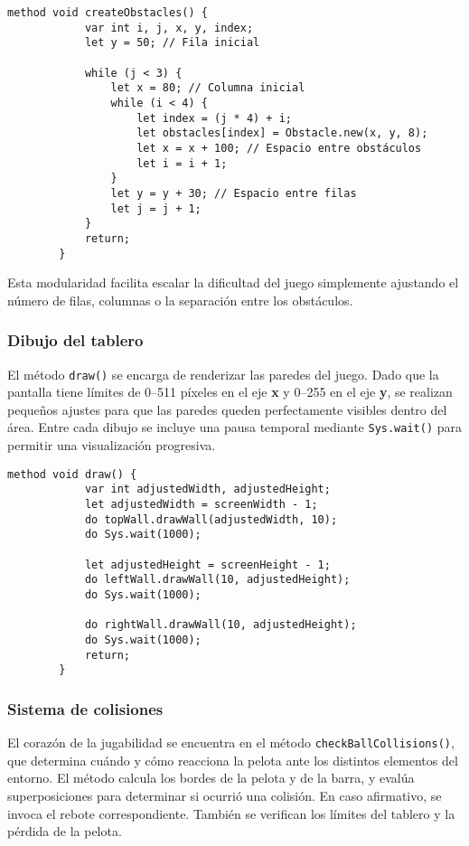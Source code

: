\documentclass[twocolumn]{article}
\begin{document}
	\begin{lstlisting}[caption=Método de creación de obstáculos]
		method void createObstacles() {
			var int i, j, x, y, index;
			let y = 50; // Fila inicial
			
			while (j < 3) {
				let x = 80; // Columna inicial
				while (i < 4) {
					let index = (j * 4) + i;
					let obstacles[index] = Obstacle.new(x, y, 8);
					let x = x + 100; // Espacio entre obstáculos
					let i = i + 1;
				}
				let y = y + 30; // Espacio entre filas
				let j = j + 1;
			}
			return;
		}
	\end{lstlisting}
	
	Esta modularidad facilita escalar la dificultad del juego simplemente ajustando el número de filas, columnas o la separación entre los obstáculos.
	
	\subsubsection{Dibujo del tablero}
	El método \texttt{draw()} se encarga de renderizar las paredes del juego. Dado que la pantalla tiene límites de 0–511 píxeles en el eje \textbf{x} y 0–255 en el eje \textbf{y}, se realizan pequeños ajustes para que las paredes queden perfectamente visibles dentro del área. Entre cada dibujo se incluye una pausa temporal mediante \texttt{Sys.wait()} para permitir una visualización progresiva.
	
	\begin{lstlisting}[caption=Método de dibujo del tablero]
		method void draw() {
			var int adjustedWidth, adjustedHeight;
			let adjustedWidth = screenWidth - 1;
			do topWall.drawWall(adjustedWidth, 10);
			do Sys.wait(1000);
			
			let adjustedHeight = screenHeight - 1;
			do leftWall.drawWall(10, adjustedHeight);
			do Sys.wait(1000);
			
			do rightWall.drawWall(10, adjustedHeight);
			do Sys.wait(1000);
			return;
		}
	\end{lstlisting}
	
	\subsubsection{Sistema de colisiones}
	El corazón de la jugabilidad se encuentra en el método \texttt{checkBallCollisions()}, que determina cuándo y cómo reacciona la pelota ante los distintos elementos del entorno.  
	El método calcula los bordes de la pelota y de la barra, y evalúa superposiciones para determinar si ocurrió una colisión. En caso afirmativo, se invoca el rebote correspondiente. También se verifican los límites del tablero y la pérdida de la pelota.
	
\end{document}
